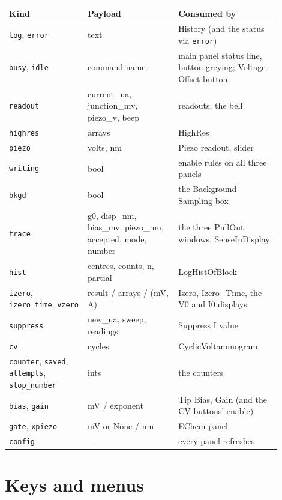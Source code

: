 \small\setlength{\LTleft}{0pt}\setlength{\LTright}{\fill}
\begin{longtable}{@{}>{\raggedright\arraybackslash}p{0.26\linewidth}>{\raggedright\arraybackslash}p{0.30\linewidth}>{\raggedright\arraybackslash}p{0.34\linewidth}@{}}
\toprule
\textbf{Kind} & \textbf{Payload} & \textbf{Consumed by} \\
\midrule\endhead
\texttt{log}, \texttt{error} & text & History (and the status via \texttt{error}) \\
\texttt{busy}, \texttt{idle} & command name & main panel status line, button greying; Voltage Offset button \\
\texttt{readout} & current\_ua, junction\_mv, piezo\_v, beep & readouts; the bell \\
\texttt{highres} & arrays & HighRes \\
\texttt{piezo} & volts, nm & Piezo readout, slider \\
\texttt{writing} & bool & enable rules on all three panels \\
\texttt{bkgd} & bool & the Background Sampling box \\
\texttt{trace} & g0, disp\_nm, bias\_mv, piezo\_nm, accepted, mode, number & the three PullOut windows, SenseInDisplay \\
\texttt{hist} & centres, counts, n, partial & LogHistOfBlock \\
\texttt{izero}, \texttt{izero\_\discretionary{}{}{}time}, \texttt{vzero} & result / arrays / (mV, \textmu{}A) & Izero, Izero\_Time, the V0 and I0 displays \\
\texttt{suppress} & new\_ua, sweep, readings & Suppress I value \\
\texttt{cv} & cycles & CyclicVoltammogram \\
\texttt{counter}, \texttt{saved}, \texttt{attempts}, \texttt{stop\_\discretionary{}{}{}number} & ints & the counters \\
\texttt{bias}, \texttt{gain} & mV / exponent & Tip Bias, Gain (and the CV buttons' enable) \\
\texttt{gate}, \texttt{xpiezo} & mV or None / nm & EChem panel \\
\texttt{config} & --- & every panel refreshes \\
\bottomrule
\end{longtable}
\normalsize

\section{Keys and menus}

